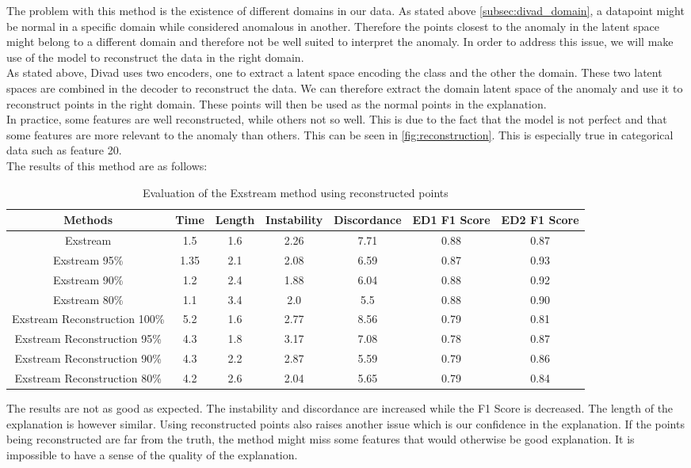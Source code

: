 \documentclass[oneside, a4paper, onecolumn, 11pt]{article}
\begin{document}
The problem with this method is the existence of different domains in our data. As stated above \autoref{subsec:divad_domain}, a datapoint might be normal in a specific domain while considered anomalous in another. Therefore the points closest to the anomaly in the latent space might belong to a different domain and therefore not be well suited to interpret the anomaly. In order to address this issue, we will make use of the model to reconstruct the data in the right domain. \\
As stated above, Divad uses two encoders, one to extract a latent space encoding the class and the other the domain. These two latent spaces are combined in the decoder to reconstruct the data. We can therefore extract the domain latent space of the anomaly and use it to reconstruct points in the right domain. These points will then be used as the normal points in the explanation.\\
In practice, some features are well reconstructed, while others not so well. This is due to the fact that the model is not perfect and that some features are more relevant to the anomaly than others. This can be seen in \autoref{fig:reconstruction}. This is especially true in categorical data such as feature 20.\\
The results of this method are as follows:
\begin{table}[h]
  \centering
  \begin{tabular}{|c|c|c|c|c|c|c|}
      \hline
      Methods & Time & Length & Instability & Discordance & ED1 F1 Score & ED2 F1 Score\\ 
      \hline
      Exstream  & 1.5  & 1.6  & 2.26  & 7.71 & 0.88 & 0.87  \\ 
      Exstream 95\%  & 1.35  & 2.1  & 2.08  & 6.59 & 0.87 & 0.93\\ 
      Exstream 90\%  & 1.2  & 2.4  & 1.88  & 6.04 & 0.88 & 0.92\\ 
      Exstream 80\% & 1.1 & 3.4 & 2.0 & 5.5 & 0.88 & 0.90 \\
      Exstream Reconstruction 100\% & 5.2  & 1.6  & 2.77  & 8.56 & 0.79 & 0.81  \\
      Exstream Reconstruction 95\%  & 4.3  & 1.8  & 3.17 & 7.08 & 0.78 & 0.87\\ 
      Exstream Reconstruction 90\%  & 4.3  & 2.2  & 2.87  & 5.59 & 0.79 & 0.86\\ 
      Exstream Reconstruction 80\% & 4.2 & 2.6 & 2.04 & 5.65 & 0.79 & 0.84 \\ 
      \hline
  \end{tabular}
  \caption{Evaluation of the Exstream method using reconstructed points}
  \label{tab:example}
\end{table}
The results are not as good as expected. The instability and discordance are increased while the F1 Score is decreased. The length of the explanation is however similar. Using reconstructed points also raises another issue which is our confidence in the explanation. If the points being reconstructed are far from the truth, the method might miss some features that would otherwise be good explanation. It is impossible to have a sense of the quality of the explanation.\\
\end{document}
